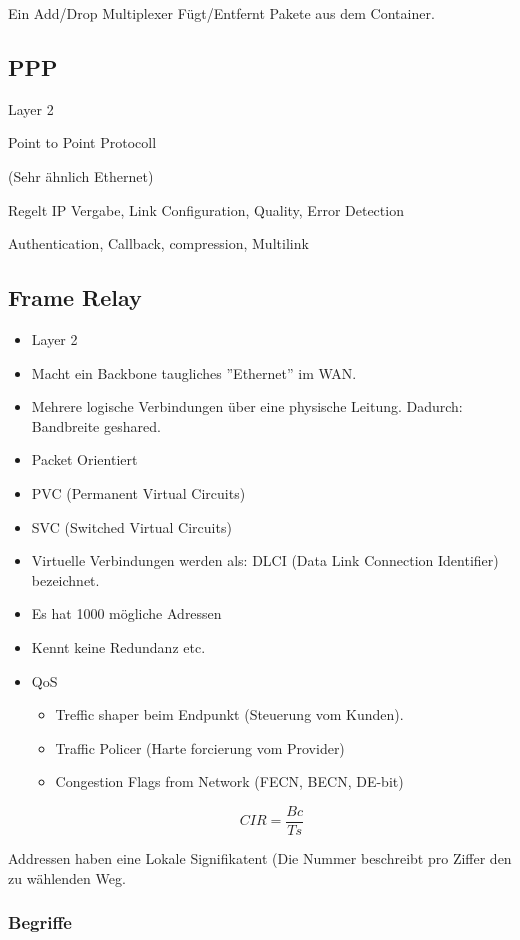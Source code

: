 Ein Add/Drop Multiplexer Fügt/Entfernt Pakete aus dem Container.

\subsection{PPP}

Layer 2

Point to Point Protocoll

(Sehr ähnlich Ethernet)

Regelt IP Vergabe, Link Configuration, Quality, Error Detection

Authentication, Callback, compression, Multilink

\subsection{Frame Relay}

\begin{itemize}
	\item Layer 2
	\item Macht ein Backbone taugliches ''Ethernet'' im WAN.
	\item Mehrere logische Verbindungen über eine physische Leitung. Dadurch: Bandbreite geshared.
	\item Packet Orientiert
	\item PVC (Permanent Virtual Circuits)
	\item SVC (Switched Virtual Circuits)
	\item Virtuelle Verbindungen werden als: DLCI (Data Link Connection Identifier) bezeichnet.
	\item Es hat 1000 mögliche Adressen
	\item Kennt keine Redundanz etc.
	\item QoS \begin{itemize}
		\item Treffic shaper beim Endpunkt (Steuerung vom Kunden).
		\item Traffic Policer (Harte forcierung vom Provider)
		\item Congestion Flags from Network (FECN, BECN, DE-bit)
	\end{itemize}
	\[
		CIR = \frac{Bc}{Ts}
	\]
\end{itemize}

Addressen haben eine Lokale Signifikatent (Die Nummer beschreibt pro Ziffer den zu wählenden Weg.

\subsubsection{Begriffe}


